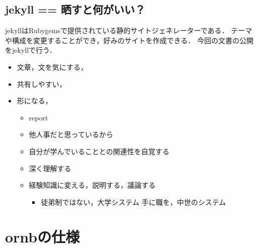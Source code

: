 \documentclass{hissymp}
\begin{document}
\subsection{jekyll == 晒すと何がいい？}
\label{sec:org410a6ab}
jekyllはRubygemsで提供されている静的サイトジェネレーターである．
テーマや構成を変更することができ，好みのサイトを作成できる．
今回の文書の公開をjekyllで行う．
\begin{itemize}
\item 文章，文を気にする，
\item 共有しやすい，
\item 形になる，
\begin{itemize}
\item report
\item 他人事だと思っているから
\item 自分が学んでいることとの関連性を自覚する
\item 深く理解する
\item 経験知識に変える，説明する，議論する
\begin{itemize}
\item 徒弟制ではない，大学システム
手に職を，中世のシステム
\end{itemize}
\end{itemize}
\end{itemize}

\section{ornbの仕様}
\label{sec:orgba882a2}
\end{document}
